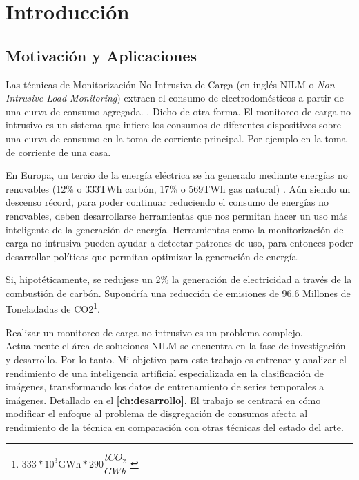 
\chapter{Introducción}
\label{ch:intro}

\section{Motivación y Aplicaciones}
\label{sec:motivacionyaplicaciones}

Las técnicas de Monitorización No Intrusiva de Carga (en inglés NILM o \textit{Non Intrusive Load Monitoring}) extraen el consumo de electrodomésticos a partir de una curva de consumo agregada. \autocite[1]{NILMreview2017}. Dicho de otra forma. El monitoreo de carga no intrusivo es un sistema que infiere los consumos de diferentes dispositivos sobre una curva de consumo en la toma de corriente principal. Por ejemplo en la toma de corriente de una casa.

En Europa, un tercio de la energía eléctrica se ha generado mediante energías no renovables (12\% o 333TWh carbón, 17\% o 569TWh gas natural) \autocite{energyeurope} \autocite{ember2024european}. Aún siendo un descenso récord, para poder continuar reduciendo el consumo de energías no renovables, deben desarrollarse herramientas que nos permitan hacer un uso más inteligente de la generación de energía. Herramientas como la monitorización de carga no intrusiva pueden ayudar a detectar patrones de uso\autocite[11]{nilmstateoftheart}, para entonces poder desarrollar políticas que permitan optimizar la generación de energía. 

Si, hipotéticamente, se redujese un 2\% la generación de electricidad a través de la combustión de carbón. Supondría una reducción de emisiones de 96.6 Millones de Toneladadas de CO2\footnote{$333*10^3\text{GWh}*290\dfrac{tCO_{2}}{GWh}$ \autocite{postcarbonelectricidad}}.

Realizar un monitoreo de carga no intrusivo es un problema complejo. Actualmente el área de soluciones NILM se encuentra en la fase de investigación y desarrollo. Por lo tanto. Mi objetivo para este trabajo es entrenar y analizar el rendimiento de una inteligencia artificial especializada en la clasificación de imágenes, transformando los datos de entrenamiento de series temporales a imágenes. Detallado en el \textbf{\autoref{ch:desarrollo}}. El trabajo se centrará en cómo modificar el enfoque al problema de disgregación de consumos afecta al rendimiento de la técnica en comparación con otras técnicas del estado del arte. 

